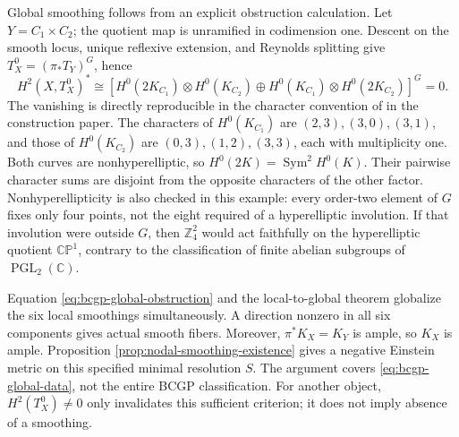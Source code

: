 \documentclass[a4paper,11pt]{article}
\numberwithin{equation}{section}
\theoremstyle{definition}
\newcommand{\CP}{\mathbb{CP}}
\newcommand{\Z}{\mathbb Z}
\begin{document}
Global smoothing follows from an explicit obstruction calculation.
Let $Y=C_1\times C_2$; the quotient map is unramified in codimension one.
Descent on the smooth locus, unique reflexive extension, and Reynolds splitting give $T_X^0=(\pi_*T_Y)^G$, hence
\begin{equation}\label{eq:bcgp-global-obstruction}
 H^2(X,T_X^0)^*\cong
 [H^0(2K_{C_1})\otimes H^0(K_{C_2})
 \oplus H^0(K_{C_1})\otimes H^0(2K_{C_2})]^G=0.
\end{equation}
The vanishing is directly reproducible in the character convention of  in the construction paper.
The characters of $H^0(K_{C_1})$ are $(2,3),(3,0),(3,1)$, and those of $H^0(K_{C_2})$ are $(0,3),(1,2),(3,3)$, each with multiplicity one.
Both curves are nonhyperelliptic, so $H^0(2K)=\operatorname{Sym}^2H^0(K)$.
Their pairwise character sums are disjoint from the opposite characters of the other factor.
Nonhyperellipticity is also checked in this example: every order-two element of $G$ fixes only four points, not the eight required of a hyperelliptic involution.
If that involution were outside $G$, then $\Z_4^2$ would act faithfully on the hyperelliptic quotient $\CP^1$, contrary to the classification of finite abelian subgroups of $\operatorname{PGL}_2(\mathbb C)$.

Equation \eqref{eq:bcgp-global-obstruction} and the local-to-global theorem \cite[Proposition 2.4(2)]{LeePark} globalize the six local smoothings simultaneously.
A direction nonzero in all six components gives actual smooth fibers.
Moreover, $\pi^*K_X=K_Y$ is ample, so $K_X$ is ample.
Proposition \ref{prop:nodal-smoothing-existence} gives a negative Einstein metric on this specified minimal resolution $S$.
The argument covers \eqref{eq:bcgp-global-data}, not the entire BCGP classification.
For another object, $H^2(T_X^0)\ne0$ only invalidates this sufficient criterion; it does not imply absence of a smoothing.
\end{document}
